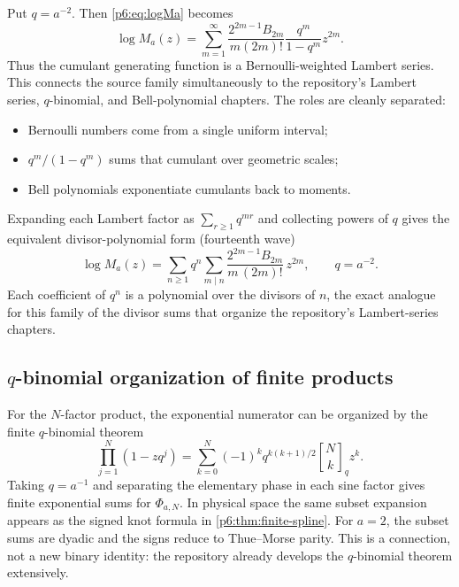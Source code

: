 \documentclass[11pt,oneside]{article}
\numberwithin{equation}{section}
\theoremstyle{definition}
\theoremstyle{remark}
\newcommand{\qbinom}[3]{\genfrac{[}{]}{0pt}{}{#1}{#2}_{#3}}
\begin{document}
Put $q=a^{-2}$.  Then \eqref{p6:eq:logMa} becomes
\begin{equation}\label{p6:eq:Lambert-moment-series}
 \log M_a(z)=
 \sum_{m=1}^{\infty}
 \frac{2^{2m-1}B_{2m}}{m(2m)!}
 \frac{q^m}{1-q^m}z^{2m}.
\end{equation}
Thus the cumulant generating function is a Bernoulli-weighted Lambert series.
This connects the source family simultaneously to the repository's Lambert
series, $q$-binomial, and Bell-polynomial chapters.  The roles are cleanly
separated:
\begin{itemize}
\item Bernoulli numbers come from a single uniform interval;
\item $q^m/(1-q^m)$ sums that cumulant over geometric scales;
\item Bell polynomials exponentiate cumulants back to moments.
\end{itemize}
Expanding each Lambert factor as $\sum_{r\ge1}q^{mr}$ and collecting powers of
$q$ gives the equivalent divisor-polynomial form (fourteenth wave)
\begin{equation}\label{p6:eq:divisor-polynomial}
 \log M_a(z)=\sum_{n\ge1}q^{n}
 \sum_{m\mid n}
 \frac{2^{2m-1}B_{2m}}{m\,(2m)!}\,z^{2m},
 \qquad q=a^{-2}.
\end{equation}
Each coefficient of $q^n$ is a polynomial over the divisors of $n$, the exact
analogue for this family of the divisor sums that organize the repository's
Lambert-series chapters.

\subsection{\texorpdfstring{$q$}{q}-binomial organization of finite products}

For the $N$-factor product, the exponential numerator can be organized by the
finite $q$-binomial theorem
\begin{equation}\label{p6:eq:q-binomial}
 \prod_{j=1}^{N}(1-zq^j)
 =\sum_{k=0}^{N}(-1)^kq^{k(k+1)/2}
 \qbinom{N}{k}{q}z^k.
\end{equation}
Taking $q=a^{-1}$ and separating the elementary phase in each sine factor gives
finite exponential sums for $\Phi_{a,N}$.  In physical space the same subset
expansion appears as the signed knot formula in
\cref{p6:thm:finite-spline}.  For $a=2$, the subset sums are dyadic and the signs
reduce to Thue--Morse parity.  This is a connection, not a new binary identity:
the repository already develops the $q$-binomial theorem extensively.
\end{document}
